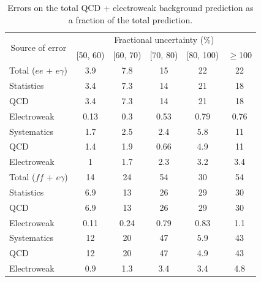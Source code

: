 \documentclass[dissertation.tex]{subfiles}
\begin{document}
\begin{table}[hcbp]
\caption{Errors on the total QCD + electroweak background prediction as a fraction of the total prediction.}
\centering
\begin{tabular}{|p{5cm}|c|c|c|c|c|}
\hline
\multicolumn{1}{|c|}{\multirow{2}{*}{Source of error}} & \multicolumn{5}{c|}{Fractional uncertainty (\%)} \\
\cline{2-6}
& [50, 60) & [60, 70) & [70, 80) & [80, 100) & $\geq$100 \\
\hline
\hline
Total ($ee$ + $e\gamma$) & 3.9 & 7.8 & 15 & 22 & 22 \\
\hline
\hspace{0.5cm}Statistics & 3.4 & 7.3 & 14 & 21 & 18 \\
\hline
\hspace{1cm}QCD & 3.4 & 7.3 & 14 & 21 & 18 \\
\hspace{1cm}Electroweak & 0.13 & 0.3 & 0.53 & 0.79 & 0.76 \\
\hline
\hspace{0.5cm}Systematics & 1.7 & 2.5 & 2.4 & 5.8 & 11 \\
\hline
\hspace{1cm}QCD & 1.4 & 1.9 & 0.66 & 4.9 & 11 \\
\hspace{1cm}Electroweak & 1 & 1.7 & 2.3 & 3.2 & 3.4 \\
\hline
Total ($\mathit{ff}$ + $e\gamma$) & 14 & 24 & 54 & 30 & 54 \\
\hline
\hspace{0.5cm}Statistics & 6.9 & 13 & 26 & 29 & 30 \\
\hline
\hspace{1cm}QCD & 6.9 & 13 & 26 & 29 & 30 \\
\hspace{1cm}Electroweak & 0.11 & 0.24 & 0.79 & 0.83 & 1.1 \\
\hline
\hspace{0.5cm}Systematics & 12 & 20 & 47 & 5.9 & 43 \\
\hline
\hspace{1cm}QCD & 12 & 20 & 47 & 4.9 & 43 \\
\hspace{1cm}Electroweak & 0.9 & 1.3 & 3.4 & 3.4 & 4.8 \\
\hline
\end{tabular}
\label{tab:total_background_prediction_errors}
\end{table}
\end{document}
